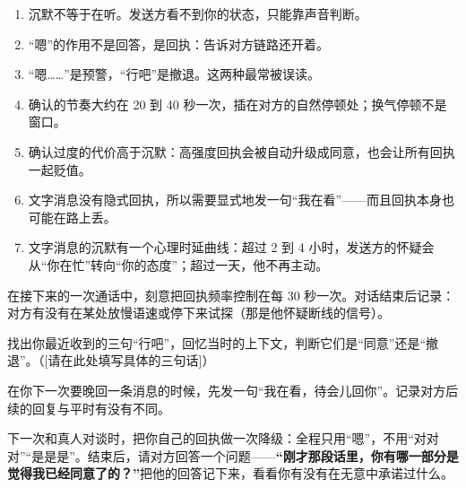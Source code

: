 \begin{enumerate}[label=\bfseries\arabic*., leftmargin=2.4em, labelsep=0.7em,
                  itemsep=0.45em, topsep=0.2em, parsep=0.2em]
\item 沉默不等于在听。发送方看不到你的状态，只能靠声音判断。
\item “嗯”的作用不是回答，是回执：告诉对方链路还开着。
\item “嗯……”是预警，“行吧”是撤退。这两种最常被误读。
\item 确认的节奏大约在 20 到 40 秒一次，插在对方的自然停顿处；换气停顿不是窗口。
\item 确认过度的代价高于沉默：高强度回执会被自动升级成同意，也会让所有回执一起贬值。
\item 文字消息没有隐式回执，所以需要显式地发一句“我在看”——而且回执本身也可能在路上丢。
\item 文字消息的沉默有一个心理时延曲线：超过 2 到 4 小时，发送方的怀疑会从“你在忙”转向“你的态度”；超过一天，他不再主动。
\end{enumerate}

\begin{exercisessec}
\item 在接下来的一次通话中，刻意把回执频率控制在每 30 秒一次。对话结束后记录：对方有没有在某处放慢语速或停下来试探（那是他怀疑断线的信号）。

\item 找出你最近收到的三句“行吧”，回忆当时的上下文，判断它们是“同意”还是“撤退”。（[请在此处填写具体的三句话]）

\item 在你下一次要晚回一条消息的时候，先发一句“我在看，待会儿回你”。记录对方后续的回复与平时有没有不同。

\item 下一次和真人对谈时，把你自己的回执做一次降级：全程只用“嗯”，不用“对对对”“是是是”。结束后，请对方回答一个问题——\textbf{“刚才那段话里，你有哪一部分是觉得我已经同意了的？”}把他的回答记下来，看看你有没有在无意中承诺过什么。
\end{exercisessec}

